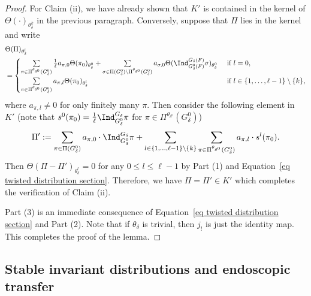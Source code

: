 \documentclass[11pt,letterpaper]{amsart}
\numberwithin{equation}{section}
\begin{document}
\begin{proof}
For Claim (ii), we have already shown that $K'$ is contained in the kernel of $\Theta(\cdot)_{\theta_\delta^k}$ in the previous paragraph. Conversely, suppose that $\Pi$ lies in the kernel and write
\begin{align*}
    & \Theta(\Pi)_{\theta_\delta^l} \\
    & = \begin{cases}
        \mathop{\sum}\limits_{\pi \in \Pi^{\theta_{\delta^0}}(G^0_{\delta})} \frac{1}{\ell} a_{\pi, 0} \Theta(\pi_0)_{\theta_\delta^0} + \mathop{\sum}\limits_{\sigma \in \Pi(G^0_{\delta})\setminus \Pi^{\theta_{\delta^0}}(G^0_{\delta})}  {a_{\sigma,0}} \Theta(\Ind_{G^0_{\delta}(F)}^{G_{\delta}(F)} \sigma)_{\theta_\delta^0} & \text{ if }l=0,\\
        \mathop{\sum}\limits_{\pi \in \Pi^{\theta_{\delta^0}}(G^0_{\delta})} a_{\pi, l} \Theta(\pi_0)_{\theta_\delta^l} & \text{ if }l \in \{1,\ldots, \ell-1\} \setminus\{k\},
    \end{cases}
\end{align*}
where $a_{\pi,l} \neq 0$ for only finitely many $\pi$. Then consider the following element in $K'$ (note that  $s^0(\pi_0)= \frac{1}{\ell}\Ind_{G^0_{\delta}}^{G_{\delta}} \pi$ for $\pi \in \Pi^{\theta_{\delta^0}}(G^0_{\delta})$)
\begin{align*}
   \Pi':= \sum_{\pi\in \Pi(G^0_\delta)} a_{\pi,0} \cdot \Ind_{G_\delta^0}^{G_\delta} \pi + \sum_{l \in \{1,\ldots,\ell-1\}\setminus \{k\}} \sum_{\pi \in \Pi^{\theta_{\delta^0}}(G^0_\delta)} a_{\pi, l} \cdot s^{l}(\pi_0).  
\end{align*}
Then $\Theta(\Pi- \Pi')_{\theta_\delta^l}=0$ for any $0 \leq l \leq \ell-1$ by Part (1) and Equation~\eqref{eq twisted distribution section}. Therefore, we have $\Pi=\Pi' \in K'$ which completes the verification of Claim (ii).

Part (3) is an immediate consequence of Equation~\eqref{eq twisted distribution section} and Part (2). 
Note that if $\theta_\delta$ is trivial, then $j_{!}$ is just the identity map.
This completes the proof of the lemma.
\end{proof}







\subsection{Stable invariant distributions and endoscopic transfer}\label{subsection: transfer}
\end{document}

